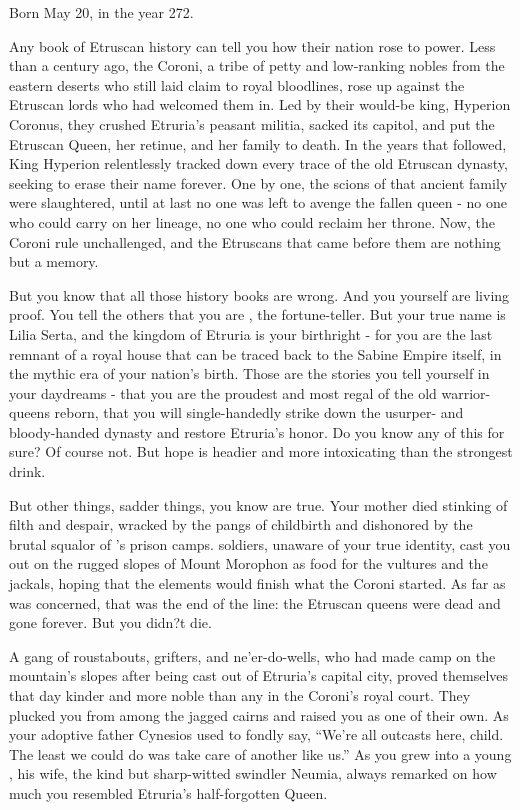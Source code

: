 \documentclass[char]{Kos}
\begin{document}
\name{\cBurglar{}}

Born May 20, in the year 272.

    Any book of Etruscan history can tell you how their nation rose to power. Less than a century ago, the Coroni, a tribe of petty and low-ranking nobles from the eastern deserts who still laid claim to royal bloodlines, rose up against the Etruscan lords who had welcomed them in. Led by their would-be king, Hyperion Coronus, they crushed Etruria's peasant militia, sacked its capitol, and put the Etruscan Queen, her retinue, and her family to death. In the years that followed, King Hyperion relentlessly tracked down every trace of the old Etruscan dynasty, seeking to erase their name forever. One by one, the scions of that ancient family were slaughtered, until at last no one was left to avenge the fallen queen - no one who could carry on her lineage, no one who could reclaim her throne. Now, the Coroni rule unchallenged, and the Etruscans that came before them are nothing but a memory. 

    But you know that all those history books are wrong. And you yourself are living proof. You tell the others that you are \cBurglar{}, the fortune-teller. But your true name is Lilia Serta, and the kingdom of Etruria is your birthright - for you are the last remnant of a royal house that can be traced back to the Sabine Empire itself, in the mythic era of your nation's birth. Those are the stories you tell yourself in your daydreams - that you are the proudest and most regal of the old warrior-queens reborn, that you will single-handedly strike down \cEtruriaKing{} the usurper-\cEtruriaKing{\monarch} and \cEtruriaKing{\their} bloody-handed dynasty and restore Etruria's honor. Do you know any of this for sure? Of course not. But hope is headier and more intoxicating than the strongest drink.

    But other things, sadder things, you know are true. Your mother died stinking of filth and despair, wracked by the pangs of childbirth and dishonored by the brutal squalor of \cEtruriaKing{\Monarch} \cEtruriaKing{}'s prison camps. \cEtruriaKing{\Their} soldiers, unaware of your true identity, cast you out on the rugged slopes of Mount Morophon as food for the vultures and the jackals, hoping that the elements would finish what the Coroni started. As far as \cEtruriaKing{\Monarch} \cEtruriaKing{} was concerned, that was the end of the line: the Etruscan queens were dead and gone forever. But you didn?t die. 

    A gang of roustabouts, grifters, and ne'er-do-wells, who had made camp on the mountain's slopes after being cast out of Etruria's capital city, proved themselves that day kinder and more noble than any in the Coroni's royal court. They plucked you from among the jagged cairns and raised you as one of their own. As your adoptive father Cynesios used to fondly say, ``We're all outcasts here, child. The least we could do was take care of another like us.'' As you grew into a young \cBurglar{\human}, his wife, the kind but sharp-witted swindler Neumia, always remarked on how much you resembled Etruria's half-forgotten Queen. 
\end{document}
